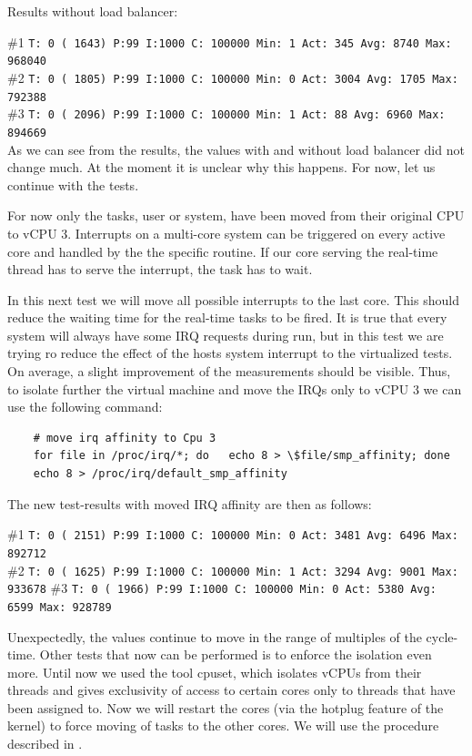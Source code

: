 \documentclass[]{scrartcl}
\begin{document}
\noindent Results without load balancer:

\noindent \small \#1 \texttt{T: 0 ( 1643) P:99 I:1000 C: 100000 Min: 1 Act:  345 Avg: 8740 Max:  968040}\\
\noindent \small \#2 \texttt{T: 0 ( 1805) P:99 I:1000 C: 100000 Min: 0 Act: 3004 Avg: 1705 Max:  792388}\\
\noindent \small \#3 \texttt{T: 0 ( 2096) P:99 I:1000 C: 100000 Min: 1 Act:   88 Avg: 6960 Max:  894669}\\

As we can see from the results, the values with and without load balancer did not change much.
At the moment it is unclear why this happens. For now, let us continue with the tests.

For now only the tasks, user or system, have been moved from their original CPU to vCPU 3. 
Interrupts on a multi-core system can be triggered on every active core and handled by the the specific routine. If our core serving the real-time thread has to serve the interrupt, the task has to wait.

In this next test we will move all possible interrupts to the last core. This should reduce the waiting time for the real-time tasks to be fired.
It is true that every system will always have some IRQ requests during run, but in this test we are trying ro reduce the effect of the hosts system interrupt to the virtualized tests.
On average, a slight improvement of the measurements should be visible.
Thus, to isolate further the virtual machine and move the IRQs only to vCPU 3 we can use the following command: 

\begin{verbatim}
	# move irq affinity to Cpu 3
	for file in /proc/irq/*; do   echo 8 > \$file/smp_affinity; done
	echo 8 > /proc/irq/default_smp_affinity
\end{verbatim}

\noindent The new test-results with moved IRQ affinity are then as follows:
 
\noindent \small \#1 \texttt{T: 0 ( 2151) P:99 I:1000 C: 100000 Min: 0 Act: 3481 Avg: 6496 Max:  892712}\\
\noindent \small \#2 \texttt{T: 0 ( 1625) P:99 I:1000 C: 100000 Min: 1 Act: 3294 Avg: 9001 Max:  933678}
\noindent \small \#3 \texttt{T: 0 ( 1966) P:99 I:1000 C: 100000 Min: 0 Act: 5380 Avg: 6599 Max:  928789}

Unexpectedly, the values continue to move in the range of multiples of the cycle-time. 
Other tests that now can be performed is to enforce the isolation even more. 
Until now we used the tool cpuset, which isolates vCPUs from their threads and gives exclusivity of access to certain cores only to threads that have been assigned to.
Now we will restart the cores (via the hotplug feature of the kernel) to force moving of tasks to the other cores. We will use the procedure described in \cite{lrt02}.
\end{document}
